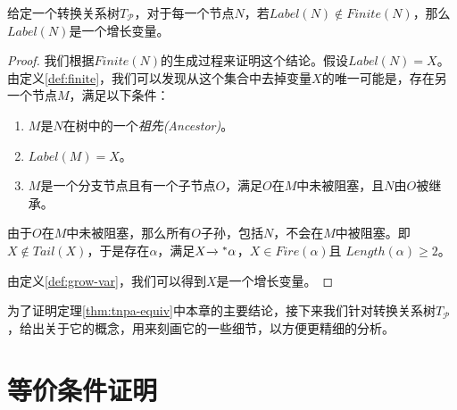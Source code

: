 \begin{lem}\label{lemma:finite}
给定一个转换关系树$T_{\mathcal{P}}$，对于每一个节点$N$，若$Label(N)\notin Finite(N)$，那么$Label(N)$是一个增长变量。
\end{lem}

\begin{proof}
我们根据$Finite(N)$的生成过程来证明这个结论。假设$Label(N)=X$。由定义\ref{def:finite}，我们可以发现从这个集合中去掉变量$X$的唯一可能是，存在另一个节点$M$，满足以下条件：
\begin{enumerate}
\item $M$是$N$在树中的一个\emph{祖先(Ancestor)}。
\item $Label(M)=X$。
\item $M$是一个分支节点且有一个子节点$O$，满足$O$在$M$中未被阻塞，且$N$由$O$被继承。
\end{enumerate}

由于$O$在$M$中未被阻塞，那么所有$O$子孙，包括$N$，不会在$M$中被阻塞。即$X\notin Tail(X)$，于是存在$\alpha$，满足$X{\xrightarrow{}{}}^{*}\alpha$，$X\in Fire(\alpha)$且 $Length(\alpha)\geq 2$。

由定义\ref{def:grow-var}，我们可以得到$X$是一个增长变量。
\end{proof}

为了证明定理\ref{thm:tnpa-equiv}中本章的主要结论，接下来我们针对转换关系树$T_{\mathcal{P}}$，给出关于它的概念，用来刻画它的一些细节，以方便更精细的分析。


\section{等价条件证明}
\label{sec:equiv-proof}

\begin{thm}\label{thm:tnpa-equiv}

\end{thm}
